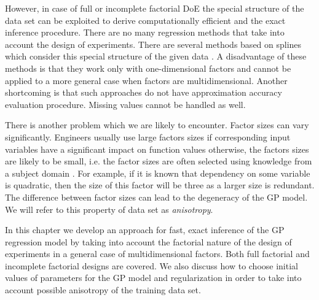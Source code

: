 However, in case of full or incomplete factorial DoE the special structure
of the data set can be exploited to derive computationally efficient
and the exact inference procedure.
There are no many regression methods that take into account the design of experiments.
There are several methods based on splines which consider this special structure of the given data \citep{stone97polynomialsplines}.
A disadvantage of these methods is that they work only with one-dimensional factors
and cannot be applied to a more general case when factors are multidimensional.
Another shortcoming is that such approaches do not have approximation accuracy evaluation procedure.
Missing values cannot be handled as well.


There is another problem which we are likely to encounter.
Factor sizes can vary significantly.
Engineers usually use large factors sizes if corresponding input variables have a significant impact on function values
otherwise, the factors sizes are likely to be small,
i.e. the factor sizes are often selected using knowledge from a subject domain \citep{rendall2008aircraftSurface}.
For example, if it is known that dependency on some variable is quadratic,
then the size of this factor will be three as a larger size is redundant.
The difference between factor sizes can lead to the degeneracy of the GP model.
We will refer to this property of data set as {\em anisotropy}.

In this chapter we develop an approach for fast, exact inference of the GP regression
model by taking into account
the factorial nature of the design of experiments in a general case of multidimensional factors.
Both full factorial and incomplete factorial designs are covered.
We also discuss how to choose initial values of parameters for
the GP model and regularization in order to
take into account possible anisotropy of the training data set.

